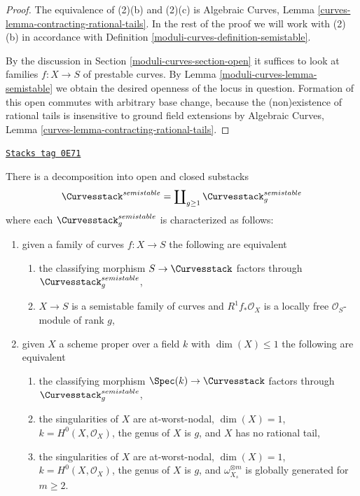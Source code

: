 \begin{proof}
The equivalence of (2)(b) and (2)(c) is
Algebraic Curves, Lemma \ref{curves-lemma-contracting-rational-tails}.
In the rest of the proof we will work with (2)(b)
in accordance with Definition \ref{moduli-curves-definition-semistable}.

\medskip\noindent
By the discussion in Section \ref{moduli-curves-section-open}
it suffices to look at families $f : X \to S$ of
prestable curves. By Lemma \ref{moduli-curves-lemma-semistable}
we obtain the desired openness of the locus in question.
Formation of this open commutes with arbitrary base change,
because the (non)existence of rational tails is insensitive
to ground field extensions by
Algebraic Curves, Lemma \ref{curves-lemma-contracting-rational-tails}.
\end{proof}

\begin{lemma}
\label{moduli-curves-lemma-semistable-one-piece-per-genus}
\href{https://stacks.math.columbia.edu/tag/0E71}{\texttt{Stacks tag 0E71}}

There is a decomposition into open and closed substacks
$$
\Curvesstack^{semistable} = \coprod\nolimits_{g \geq 1}
\Curvesstack^{semistable}_g
$$
where each $\Curvesstack^{semistable}_g$ is characterized as follows:
\begin{enumerate}
\item given a family of curves $f : X \to S$ the following are equivalent
\begin{enumerate}
\item the classifying morphism $S \to \Curvesstack$ factors
through $\Curvesstack^{semistable}_g$,
\item $X \to S$ is a semistable family of curves and
$R^1f_*\mathcal{O}_X$ is a locally free $\mathcal{O}_S$-module of rank $g$,
\end{enumerate}
\item given $X$ a scheme proper over a field $k$ with
$\dim(X) \leq 1$ the following are equivalent
\begin{enumerate}
\item the classifying morphism $\Spec(k) \to \Curvesstack$
factors through $\Curvesstack^{semistable}_g$,
\item the singularities of $X$ are at-worst-nodal, $\dim(X) = 1$,
$k = H^0(X, \mathcal{O}_X)$, the genus of $X$ is $g$, and $X$
has no rational tail,
\item the singularities of $X$ are at-worst-nodal, $\dim(X) = 1$,
$k = H^0(X, \mathcal{O}_X)$, the genus of $X$ is $g$, and
$\omega_{X_s}^{\otimes m}$ is globally generated for $m \geq 2$.
\end{enumerate}
\end{enumerate}
\end{lemma}


